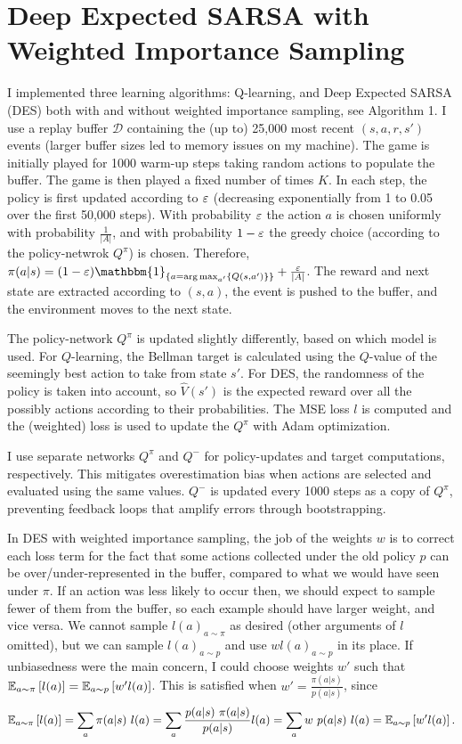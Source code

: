 \documentclass{article}
\begin{document}
\section{Deep Expected SARSA with Weighted Importance Sampling}
I implemented three learning algorithms: Q-learning, and Deep Expected SARSA (DES) both with and without weighted importance sampling, see Algorithm 1.
I use a replay buffer \(\mathcal{D}\) containing the (up to) 25,000 most recent \((s, a, r, s')\) events (larger buffer sizes led to memory issues on my machine). The game is initially played for 1000 warm-up steps taking random actions to populate the buffer. The game is then played a fixed number of times \(K\). In each step, the policy is first updated according to \(\varepsilon\) (decreasing exponentially from 1 to 0.05 over the first 50,000 steps). With probability \(\varepsilon\) the action \(a\) is chosen uniformly with probability \(\frac{1}{|A|}\), and with probability \(1-\varepsilon\) the greedy choice (according to the policy-netwrok \(Q^\pi\)) is chosen. Therefore, \(\pi(a|s) = (1 - \eps) \mathbbm{1}_{\set{a = \arg\max_{a'}\set{Q(s,a')}}} + \frac{\eps}{|A|}\). The reward and next state are extracted according to \((s,a)\), the event is pushed to the buffer, and the environment moves to the next state.

The policy-network \(Q^\pi\) is updated slightly differently, based on which model is used. For \(Q\)-learning, the Bellman target is calculated using the \(Q\)-value of the seemingly best action to take from state \(s'\). For DES, the randomness of the policy is taken into account, so \(\hat{V}(s')\) is the expected reward over all the possibly actions according to their probabilities. The MSE loss \(l\) is computed and the (weighted) loss is used to update the \(Q^\pi\) with Adam optimization.

I use separate networks \(Q^\pi\) and \(Q^-\) for policy-updates and target computations, respectively. This mitigates overestimation bias when actions are selected and evaluated using the same values. \(Q^-\) is updated every 1000 steps as a copy of \(Q^\pi\), preventing feedback loops that amplify errors through bootstrapping.

In DES with weighted importance sampling, the job of the weights \(w\) is to correct each loss term for the fact that some actions collected under the old policy \(p\) can be over/under-represented in the buffer, compared to what we would have seen under \(\pi\). If an action was less likely to occur then, we should expect to sample fewer of them from the buffer, so each example should have larger weight, and vice versa. We cannot sample \(l(a)_{a \sim \pi}\) as desired (other arguments of \(l\) omitted), but we can sample \(l(a)_{a \sim p}\) and use \(w l(a)_{a \sim p}\) in its place. If unbiasedness were the main concern, I could choose weights \(w'\) such that \(\mathbb{E}_{a \sim \pi} \left[ l(a) \right] = \mathbb{E}_{a \sim p} \left[ w' l(a) \right]\). This is satisfied when \(w' = \frac{\pi(a|s)}{p(a|s)}\), since
\[
    \mathbb{E}_{a \sim \pi}\left[ l(a) \right]
    = \sum_{a} {\pi(a|s) \ l(a)}
    = \sum_{a} {\frac{p(a|s) \ \pi(a|s)}{p(a|s)} l(a)}
    = \sum_{a} {w \ p(a|s) \ l(a)}
    = \mathbb{E}_{a \sim p} \left[ w' l(a) \right].
\]
\end{document}
